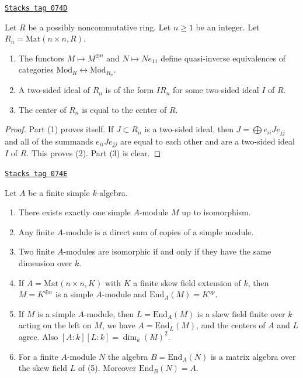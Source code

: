 \begin{lemma}
\label{brauer-lemma-matrix-algebras}
\href{https://stacks.math.columbia.edu/tag/074D}{\texttt{Stacks tag 074D}}

Let $R$ be a possibly noncommutative ring. Let $n \geq 1$ be an integer.
Let $R_n = \text{Mat}(n \times n, R)$.
\begin{enumerate}
\item The functors $M \mapsto M^{\oplus n}$ and
$N \mapsto Ne_{11}$ define quasi-inverse equivalences of categories
$\text{Mod}_R \leftrightarrow \text{Mod}_{R_n}$.
\item A two-sided ideal of $R_n$ is of the form $IR_n$ for some
two-sided ideal $I$ of $R$.
\item The center of $R_n$ is equal to the center of $R$.
\end{enumerate}
\end{lemma}

\begin{proof}
Part (1) proves itself. If $J \subset R_n$ is a two-sided ideal, then
$J = \bigoplus e_{ii}Je_{jj}$ and all of the summands $e_{ii}Je_{jj}$ are
equal to each other and are a two-sided ideal $I$ of $R$. This proves (2).
Part (3) is clear.
\end{proof}

\begin{lemma}
\label{brauer-lemma-simple-module-unique}
\href{https://stacks.math.columbia.edu/tag/074E}{\texttt{Stacks tag 074E}}

Let $A$ be a finite simple $k$-algebra.
\begin{enumerate}
\item There exists exactly one simple $A$-module $M$ up to isomorphism.
\item Any finite $A$-module is a direct sum of copies of a simple module.
\item Two finite $A$-modules are isomorphic if and only if they
have the same dimension over $k$.
\item If $A = \text{Mat}(n \times n, K)$ with $K$ a finite skew field
extension of $k$, then $M = K^{\oplus n}$ is a simple $A$-module and
$\text{End}_A(M) = K^{op}$.
\item If $M$ is a simple $A$-module, then $L = \text{End}_A(M)$
is a skew field finite over $k$ acting on the left on $M$, we have
$A = \text{End}_L(M)$, and the centers of $A$ and $L$ agree.
Also $[A : k] [L : k] = \dim_k(M)^2$.
\item For a finite $A$-module $N$ the algebra $B = \text{End}_A(N)$ is a
matrix algebra over the skew field $L$ of (5). Moreover $\text{End}_B(N) = A$.
\end{enumerate}
\end{lemma}


